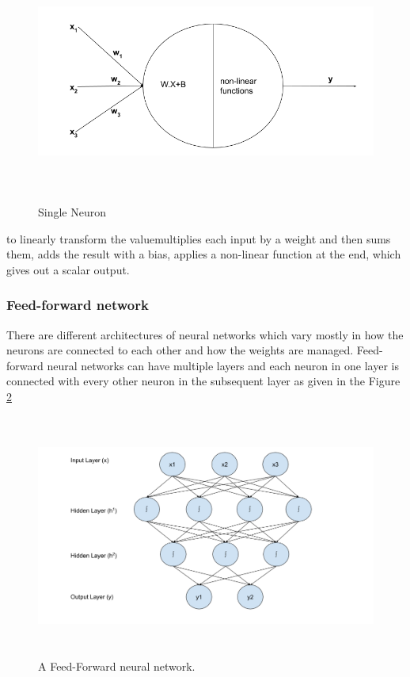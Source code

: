 \documentclass[a4paper, 11pt]{article}
\begin{document}
\begin{figure}[htpb]
    \centering
    \includegraphics[width=\textwidth,height=8cm,keepaspectratio=true]
    {single-neuron.png}
    \caption{
        Single Neuron
    }
    \label{fig:single_neuron}
\end{figure}

 to linearly transform the valuemultiplies each input by a weight and then sums them, adds the result with a bias, applies a non-linear function at the end, which gives out a scalar output. 

\subsubsection{Feed-forward network}

There are different architectures of neural networks which vary mostly in how the neurons are connected to each other and how the weights are managed. Feed-forward neural networks \parencite{Svozil1997} can have multiple layers and each neuron in one layer is connected with every other neuron in the subsequent layer as given in the Figure \ref{fig:Feed forward neural network}

\begin{figure}[htpb]
    \centering
    \includegraphics[width=\textwidth,height=8cm,keepaspectratio=true]
    {feed-forward-neural-network.png}
    \caption{
        A Feed-Forward neural network.
    }
    \label{fig:Feed forward neural network}
\end{figure}
\end{document}
